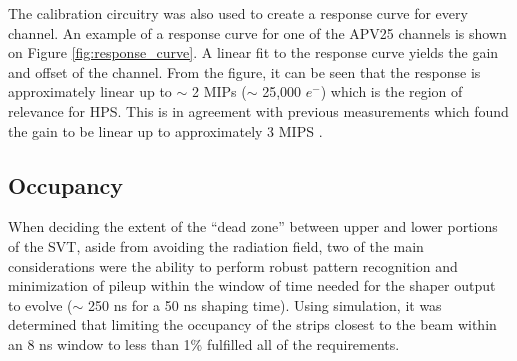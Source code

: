 The calibration circuitry was also used to create a response
curve for every channel.  An example of a response curve for one of the 
APV25 channels is shown on Figure \ref{fig:response_curve}.  A linear fit
to the response curve yields the gain and offset of the channel. From the figure, 
it can be seen that the response is approximately linear up to $\sim$ 2 MIPs 
($\sim$ 25,000 $e^{-}$) which is the region of relevance for HPS.
This is in agreement with previous measurements which found the gain to be 
linear up to approximately 3 MIPS \cite{French:2001xb}.

\subsection{Occupancy}

When deciding the extent of the ``dead zone'' between upper and lower portions
of the SVT, aside from avoiding the radiation field, 
two of the main considerations were the ability to perform robust pattern 
recognition and minimization of pileup within the window of time needed for 
the shaper output to evolve ($\sim$ 250 ns for a 50 ns shaping time).  Using
simulation, it was determined that limiting the occupancy of the strips closest
to the beam within an 8 ns window to less than 1\% fulfilled all of the requirements. 

